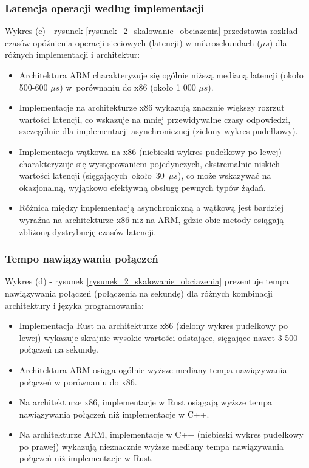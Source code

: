 \subsubsection{Latencja operacji według implementacji}
Wykres (c) - rysunek \ref{rysunek_2_skalowanie_obciazenia} przedstawia rozkład czasów opóźnienia operacji sieciowych (latencji) w mikrosekundach ($\mu s$) dla różnych implementacji i architektur:
\begin{itemize}
    \item Architektura ARM charakteryzuje się ogólnie niższą medianą latencji (około 500-600 $\mu s$) w~porównaniu do x86 (około 1 000 $\mu s$).
    \item Implementacje na architekturze x86 wykazują znacznie większy rozrzut wartości latencji, co wskazuje na mniej przewidywalne czasy odpowiedzi, szczególnie dla implementacji asynchronicznej (zielony wykres pudełkowy).
    \item Implementacja wątkowa na x86 (niebieski wykres pudełkowy po lewej) charakteryzuje się występowaniem pojedynczych, ekstremalnie niskich wartości latencji \mbox{(sięgających około 30 $\mu s$)}, co może wskazywać na okazjonalną, wyjątkowo efektywną obsługę pewnych typów żądań.
    \item Różnica między implementacją asynchroniczną a wątkową jest bardziej wyraźna na architekturze x86 niż na ARM, gdzie obie metody osiągają zbliżoną dystrybucję czasów latencji.
\end{itemize}

\subsubsection{Tempo nawiązywania połączeń}
Wykres (d) - rysunek \ref{rysunek_2_skalowanie_obciazenia} prezentuje tempa nawiązywania połączeń (połączenia na sekundę) dla różnych kombinacji architektury i języka programowania:
\begin{itemize}
    \item Implementacja Rust na architekturze x86 (zielony wykres pudełkowy po lewej) wykazuje skrajnie wysokie wartości odstające, sięgające nawet 3 500+ połączeń na sekundę.
    \item Architektura ARM osiąga ogólnie wyższe mediany tempa nawiązywania połączeń w porównaniu do x86.
    \item Na architekturze x86, implementacje w Rust osiągają wyższe tempa nawiązywania połączeń niż implementacje w C++.
    \item Na architekturze ARM, implementacje w C++ (niebieski wykres pudełkowy po prawej) wykazują nieznacznie wyższe mediany tempa nawiązywania połączeń niż implementacje w Rust.
\end{itemize}

